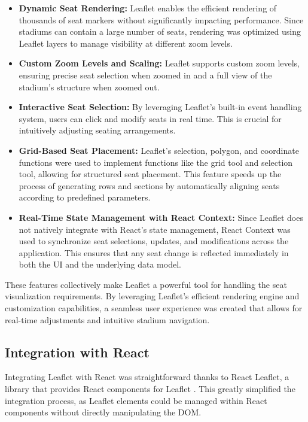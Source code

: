\begin{itemize}
    \item \textbf{Dynamic Seat Rendering:} Leaflet enables the efficient rendering of thousands of seat markers without significantly impacting performance. Since stadiums can contain a large number of seats, rendering was optimized using Leaflet layers to manage visibility at different zoom levels.
    \item \textbf{Custom Zoom Levels and Scaling:} Leaflet supports custom zoom levels, ensuring precise seat selection when zoomed in and a full view of the stadium’s structure when zoomed out.
    \item \textbf{Interactive Seat Selection:} By leveraging Leaflet’s built-in event handling system, users can click and modify seats in real time. This is crucial for intuitively adjusting seating arrangements.
    \item \textbf{Grid-Based Seat Placement:} Leaflet’s selection, polygon, and coordinate functions were used to implement functions like the grid tool and selection tool, allowing for structured seat placement. This feature speeds up the process of generating rows and sections by automatically aligning seats according to predefined parameters.
    \item \textbf{Real-Time State Management with React Context:} Since Leaflet does not natively integrate with React’s state management, React Context was used to synchronize seat selections, updates, and modifications across the application. This ensures that any seat change is reflected immediately in both the UI and the underlying data model.
\end{itemize}

These features collectively make Leaflet a powerful tool for handling the seat visualization requirements. By leveraging Leaflet’s efficient rendering engine and customization capabilities, a seamless user experience was created that allows for real-time adjustments and intuitive stadium navigation.

\subsection{Integration with React}
Integrating Leaflet with React was straightforward thanks to React Leaflet, a library that provides React components for Leaflet \cite{ReactLeafletDocs}. This greatly simplified the integration process, as Leaflet elements could be managed within React components without directly manipulating the DOM.

